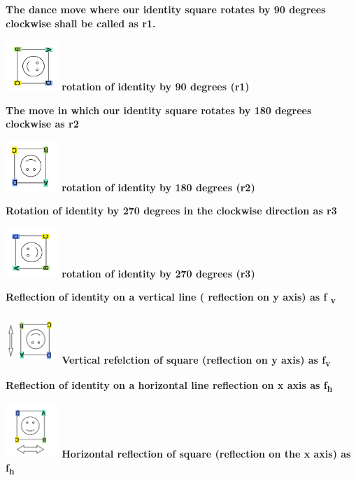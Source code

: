 \documentclass{article}
\begin{document}
\textbf{The dance move where our identity square rotates by 90 degrees clockwise  shall be called as r1.}
\begin{center}
    \includegraphics[scale = 0.9, width = 2cm]{images/ninty_clockwise.png}
    \center\textbf{rotation of identity by 90 degrees  (r1)}
\end{center}

\textbf{The move in which our identity square rotates by 180 degrees clockwise as r2} 
\begin{center}
    \includegraphics[scale = 0.9, width = 2cm]{images/one_eighty.png}
    \center\textbf{rotation of identity by 180 degrees (r2)}
\end{center}

\textbf{Rotation of identity by 270 degrees in the clockwise direction as r3 }
\begin{center}
    \includegraphics[scale = 0.9, width = 2cm]{images/two_seventy.png}
    \center\textbf{rotation of identity by 270 degrees (r3)}
\end{center}

\pagebreak
\textbf{Reflection of identity on a vertical line ( reflection on y axis) as f \textsubscript{v}}
\begin{center}
    \includegraphics[scale = 0.9,width = 2cm] {images/y_axis.png}
    \center\textbf{Vertical refelction of square (reflection on y axis)  as f\textsubscript{v}}
\end{center}

\textbf{Reflection of identity on a horizontal line  reflection on x axis as f\textsubscript{h}}
\begin{center}
    \includegraphics[scale = 0.9, width = 2cm] {images/x_axis.png}
    \center\textbf{Horizontal reflection of square (reflection on the x axis) as f\textsubscript{h}}
\end{center}
 
\end{document}
